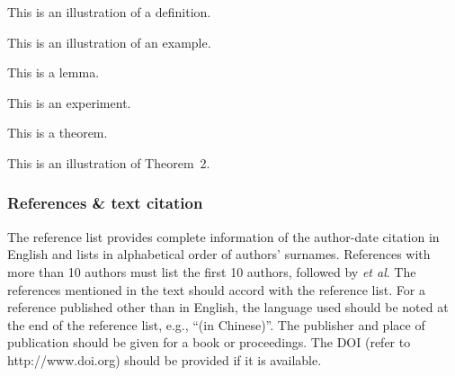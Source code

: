 \documentclass[twoside,twocolumn]{article}
\begin{document}
\begin{definition}
This is an illustration of a definition.
\end{definition}

\begin{example}
This is an illustration of an example.
\end{example}

\begin{lemma}
This is a lemma.
\end{lemma}

\begin{experiment}
This is an experiment.
\end{experiment}

\begin{theorem}
This is a theorem.
\end{theorem}

\begin{theorem}
This is an illustration of Theorem~2.
\end{theorem}

\subsubsection{References \& text citation}

The reference list provides complete information of the author-date citation in English and lists in alphabetical order of authors' surnames.
References with more than 10 authors must list the first 10 authors, followed by \emph{et al}. The references mentioned in the text should accord with the reference list. For a reference published other than in English, the language used should be noted at the end of the reference list, e.g., ``(in Chinese)''. The publisher and place of publication should be given for a book or proceedings. The DOI (refer to http://www.doi.org) should be provided if it is available.
\end{document}
